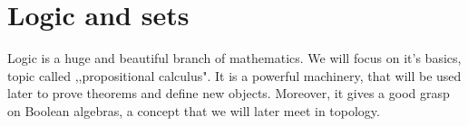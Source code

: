 
\chapter{Logic and sets}
\label{logic_and_sets}

Logic is a huge and beautiful branch of mathematics. We will focus on it's basics, topic called ,,propositional calculus". It is a powerful machinery, that will be used later
to prove theorems and define new objects. Moreover, it gives a good grasp on Boolean algebras, a concept that we will later meet in topology.









% 
